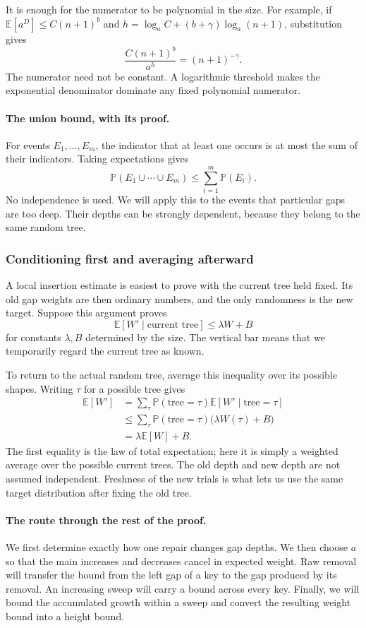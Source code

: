 \documentclass[11pt,a4paper]{article}
\theoremstyle{readable}
\newcommand{\E}{\mathbb E}
\newcommand{\Prob}{\mathbb P}
\begin{document}
It is enough for the numerator to be polynomial in the size. For example,
if $\E[a^D]\le C(n+1)^b$ and
$h=\log_a C+(b+\gamma)\log_a(n+1)$, substitution gives
\[
  \frac{C(n+1)^b}{a^h}=(n+1)^{-\gamma}.
\]
The numerator need not be constant. A logarithmic threshold makes the
exponential denominator dominate any fixed polynomial numerator.

\paragraph{The union bound, with its proof.}
For events $E_1,\ldots,E_m$, the indicator that at least one occurs is
at most the sum of their indicators. Taking expectations gives
\[
  \Prob(E_1\cup\cdots\cup E_m)
    \le\sum_{i=1}^m\Prob(E_i).
\]
No independence is used. We will apply this to the events that particular
gaps are too deep. Their depths can be strongly dependent, because they
belong to the same random tree.

\subsubsection*{Conditioning first and averaging afterward}
A local insertion estimate is easiest to prove with the current tree
held fixed. Its old gap weights are then ordinary numbers, and the
only randomness is the new target. Suppose this argument proves
\[
  \E[W'\mid\text{current tree}]
     \le\lambda W+B
\]
for constants $\lambda,B$ determined by the size. The vertical bar
means that we temporarily regard the current tree as known.

To return to the actual random tree, average this inequality over its
possible shapes. Writing $\tau$ for a possible tree gives
\begin{align*}
  \E[W']
  &=\sum_\tau\Prob(\text{tree}=\tau)
       \E[W'\mid\text{tree}=\tau]\\
  &\le\sum_\tau\Prob(\text{tree}=\tau)
       \bigl(\lambda W(\tau)+B\bigr)\\
  &=\lambda\E[W]+B.
\end{align*}
The first equality is the law of total expectation; here it is simply
a weighted average over the possible current trees. The old depth and
new depth are not assumed independent. Freshness of the new trials is
what lets us use the same target distribution after fixing the old tree.

\paragraph{The route through the rest of the proof.}
We first determine exactly how one repair changes gap depths. We then
choose $a$ so that the main increases and decreases cancel in expected
weight. Raw removal will transfer the bound from the left gap of a key
to the gap produced by its removal. An increasing sweep will carry a
bound across every key. Finally, we will bound the accumulated growth
within a sweep and convert the resulting weight bound into a height bound.
\end{document}
